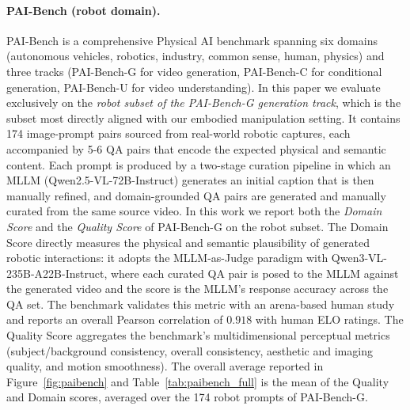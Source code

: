 \paragraph{PAI-Bench (robot domain).}
PAI-Bench is a comprehensive Physical AI benchmark spanning six domains (autonomous
vehicles, robotics, industry, common sense, human, physics) and three tracks (PAI-Bench-G
for video generation, PAI-Bench-C for conditional generation, PAI-Bench-U for video
understanding). In this paper we evaluate exclusively on the \emph{robot subset of the
PAI-Bench-G generation track}, which is the subset most directly aligned with our embodied
manipulation setting. It contains 174 image-prompt pairs sourced from real-world robotic
captures, each accompanied by 5-6 QA pairs that encode the expected physical and
semantic content. Each prompt is produced by a two-stage curation pipeline in which an
MLLM (Qwen2.5-VL-72B-Instruct) generates an initial caption that is then manually
refined, and domain-grounded QA pairs are generated and manually curated from the same
source video. In this work we report both the \emph{Domain Score} and the \emph{Quality Score} of
PAI-Bench-G on the robot subset. The Domain Score directly measures the physical and
semantic plausibility of generated robotic interactions: it adopts the MLLM-as-Judge
paradigm with Qwen3-VL-235B-A22B-Instruct, where each curated QA pair is posed to the MLLM
against the generated video and the score is the MLLM's response accuracy across the QA
set. The benchmark validates this metric with an arena-based human study and reports an
overall Pearson correlation of $0.918$ with human ELO ratings. The Quality Score
aggregates the benchmark's multidimensional perceptual metrics (subject/background
consistency, overall consistency, aesthetic and imaging quality, and motion smoothness).
The overall average reported in Figure~\ref{fig:paibench} and Table~\ref{tab:paibench_full}
is the mean of the Quality and Domain scores, averaged over the 174 robot prompts of
PAI-Bench-G.

